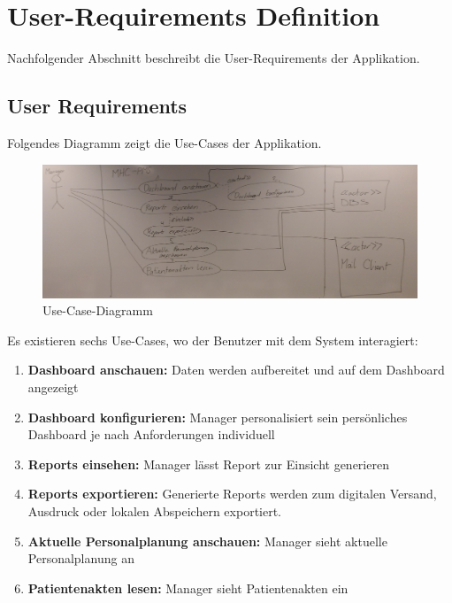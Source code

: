\documentclass[a4paper]{scrreprt}
\begin{document}
\chapter{User-Requirements Definition}
Nachfolgender Abschnitt beschreibt die User-Requirements der Applikation.


\section{User Requirements}
Folgendes Diagramm zeigt die Use-Cases der Applikation.

\begin{figure}[htbp]
\includegraphics[width=1\textwidth]{img/use_case_diagram_20160401.png}
\caption[Use-Case-Diagramm]{Use-Case-Diagramm}
\end{figure}

\bigskip

Es existieren sechs Use-Cases, wo der Benutzer mit dem System interagiert:
\begin{enumerate}
\item \textbf{Dashboard anschauen:} Daten werden aufbereitet und auf dem Dashboard angezeigt
\item \textbf{Dashboard konfigurieren:} Manager personalisiert sein persönliches Dashboard je nach Anforderungen individuell
\item \textbf{Reports einsehen:} Manager lässt Report zur Einsicht generieren
\item \textbf{Reports exportieren:} Generierte Reports werden zum digitalen Versand, Ausdruck oder lokalen Abspeichern exportiert.
\item \textbf{Aktuelle Personalplanung anschauen:} Manager sieht aktuelle Personalplanung an
\item \textbf{Patientenakten lesen:} Manager sieht Patientenakten ein
\end{enumerate}
\end{document}
